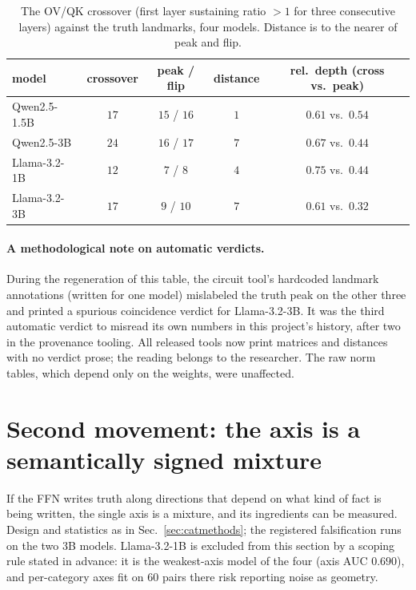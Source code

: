 \documentclass[11pt]{article}
\begin{document}
\begin{table}[H]
\centering
\caption{The OV/QK crossover (first layer sustaining ratio $>1$ for three
consecutive layers) against the truth landmarks, four models. Distance is
to the nearer of peak and flip.}
\label{tab:crossover}
\begin{tabular}{lcccc}
\toprule
model & crossover & peak / flip & distance & rel.\ depth (cross vs.\ peak) \\
\midrule
Qwen2.5-1.5B & $17$ & $15$ / $16$ & $1$ & $0.61$ vs.\ $0.54$ \\
Qwen2.5-3B   & $24$ & $16$ / $17$ & $7$ & $0.67$ vs.\ $0.44$ \\
Llama-3.2-1B & $12$ & $7$ / $8$   & $4$ & $0.75$ vs.\ $0.44$ \\
Llama-3.2-3B & $17$ & $9$ / $10$  & $7$ & $0.61$ vs.\ $0.32$ \\
\bottomrule
\end{tabular}
\end{table}

\paragraph{A methodological note on automatic verdicts.} During the
regeneration of this table, the circuit tool's hardcoded landmark
annotations (written for one model) mislabeled the truth peak on the other
three and printed a spurious coincidence verdict for Llama-3.2-3B. It was
the third automatic verdict to misread its own numbers in this project's
history, after two in the provenance tooling. All released tools now print
matrices and distances with no verdict prose; the reading belongs to the
researcher. The raw norm tables, which depend only on the weights, were
unaffected.

\section{Second movement: the axis is a semantically signed mixture}
\label{sec:mixture}

If the FFN writes truth along directions that depend on what kind of fact
is being written, the single axis is a mixture, and its ingredients can be
measured. Design and statistics as in Sec.~\ref{sec:catmethods}; the
registered falsification runs on the two 3B models. Llama-3.2-1B is
excluded from this section by a scoping rule stated in advance: it is the
weakest-axis model of the four (axis AUC $0.690$), and per-category axes
fit on $60$ pairs there risk reporting noise as geometry.
\end{document}
